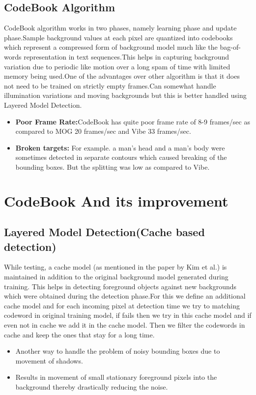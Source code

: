 \documentclass[12pt,a4paper]{report}
\begin{document}
\subsection*{CodeBook Algorithm}
CodeBook algorithm works in two phases, namely learning phase and update phase.Sample background values at each pixel are quantized into codebooks which represent a compressed form of background model much like the bag-of-words representation in text sequences.This helps in capturing background variation due to periodic like motion over a long spam of time with limited memory being used.One of the advantages over other algorithm is that it does not need to be trained on strictly empty frames.Can somewhat handle illumination variations and moving backgrounds but this is better handled using Layered Model Detection.
\begin{itemize}
\item {\bf Poor Frame Rate:}CodeBook has quite poor frame rate of 8-9 frames/sec as compared to MOG 20 frames/sec and Vibe
33 frames/sec. 
\item {\bf Broken targets:} For example. a man's head and a man's body were sometimes detected in separate contours which caused breaking of the bounding boxes. But the splitting was low as compared to Vibe.
\end{itemize} 

\section*{CodeBook And its improvement}
\subsection*{Layered Model Detection(Cache based detection)}
While testing, a cache model (as mentioned in the paper by Kim et al.) is maintained in addition to the original background model generated during training. This helps in detecting foreground objects against new
backgrounds which were obtained during the detection phase.For this we define an additional cache model and for each incoming pixel at detection time we try to matching codeword in original training model, if fails then we try in this cache model and if even not in cache we add it in the cache model. Then we filter the codewords in cache and keep the ones that stay for a long time. 
\begin{itemize}
\item Another way to handle the problem of noisy bounding boxes due to movement of shadows. 
\item Results in movement of small stationary foreground pixels into the background thereby drastically reducing the noise.
\end{itemize}
\end{document}
